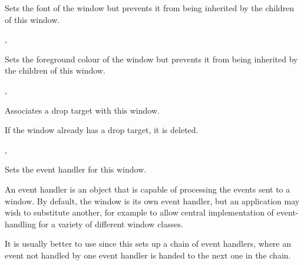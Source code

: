 Sets the font of the window but prevents it from being inherited by the
children of this window.


,\rtfsp
{}


\label{wxwindowsetownforegroundcolour}


Sets the foreground colour of the window but prevents it from being inherited
by the children of this window.


,\rtfsp
{}


\label{wxwindowsetdroptarget}


Associates a drop target with this window.

If the window already has a drop target, it is deleted.


,



\label{wxwindowseteventhandler}


Sets the event handler for this window.




An event handler is an object that is capable of processing the events
sent to a window. By default, the window is its own event handler, but
an application may wish to substitute another, for example to allow
central implementation of event-handling for a variety of different
window classes.

It is usually better to use  since
this sets up a chain of event handlers, where an event not handled by one event handler is
handed to the next one in the chain.


